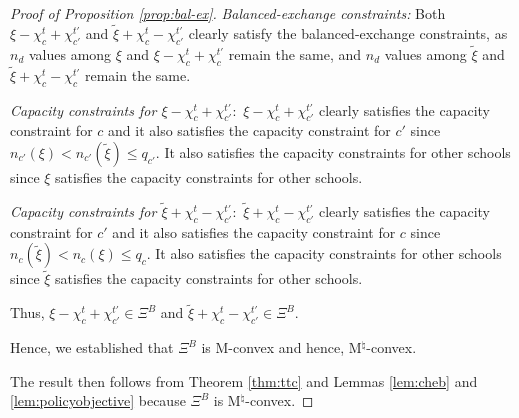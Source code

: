 \documentclass[12pt]{amsart}
\theoremstyle{remark}
\begin{document}
\begin{proof}[Proof of Proposition \ref{prop:bal-ex}]
\smallskip
\noindent \emph{Balanced-exchange constraints:} Both $\xi-\chi_c^t+\chi_{c'}^{t'}$ and $\tilde{\xi}+\chi_c^t-\chi_{c'}^{t'}$ clearly satisfy the balanced-exchange constraints, as $n_d$ values among $\xi$ and $\xi-\chi_c^t+\chi_{c}^{t'}$ remain the same, and $n_d$ values among $\tilde \xi$ and $\tilde{\xi}+\chi_c^t-\chi_{c}^{t'}$ remain the same.

\smallskip
\noindent \emph{Capacity constraints for $\xi-\chi_c^t+\chi_{c'}^{t'}:$} $\xi-\chi_c^t+\chi_{c'}^{t'}$ clearly satisfies the capacity constraint for $c$ and it also satisfies the capacity constraint for $c'$ since $n_{c'}(\xi) < n_{c'}(\tilde \xi) \leq q_{c'}$. It also satisfies the capacity constraints for other schools since $\xi$ satisfies the capacity constraints for other schools.

\smallskip
\noindent \emph{Capacity constraints for $\tilde{\xi}+\chi_c^t-\chi_{c'}^{t'}:$} $\tilde{\xi}+\chi_c^t-\chi_{c'}^{t'}$ clearly satisfies the capacity constraint for $c'$ and it also satisfies the capacity constraint for $c$ since  $n_c(\tilde \xi) < n_c(\xi) \leq q_c$. It also satisfies the capacity constraints for other schools since $\tilde{\xi}$ satisfies the capacity constraints for other schools.

Thus, $\xi-\chi_c^t+\chi_{c'}^{t'} \in \Xi^{B}$ and $\tilde{\xi}+\chi_c^t-\chi_{c'}^{t'}\in \Xi^{B}$.

Hence, we established that $\Xi^{B}$ is M-convex and hence, M$^{\natural}$-convex.

The result then follows from Theorem \ref{thm:ttc} and Lemmas \ref{lem:cheb} and \ref{lem:policyobjective} because $\Xi^{B}$ is M$^{\natural}$-convex.
\end{proof}
\end{document}
